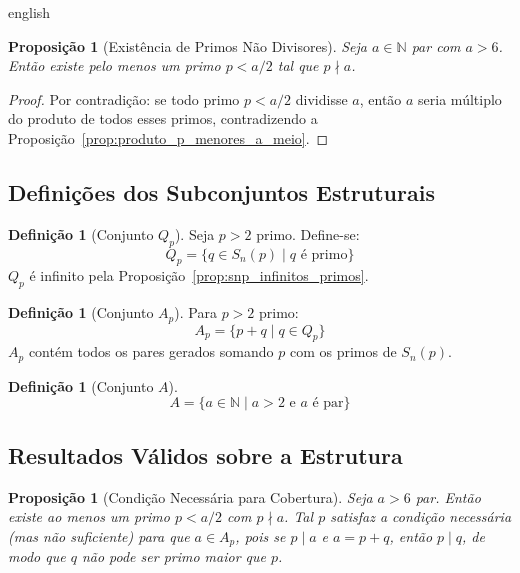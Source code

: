 \documentclass[a4paper,11pt]{article}
\newtheorem{proposition}[theorem]{Proposição}
\theoremstyle{definition}
\newtheorem{definition}[theorem]{Definição}
\theoremstyle{remark}
\begin{document}
\begin{otherlanguage*}{english}
		\begin{proposition}[Existência de Primos Não Divisores]%
			\label{prop:existencia_de_primos_nao_divisores}
			Seja $a \in \mathbb{N}$ par com $a > 6$. Então existe pelo menos um
			primo $p < a/2$ tal que $p \nmid a$.
		\end{proposition}
		
		\begin{proof}
			Por contradição: se todo primo $p < a/2$ dividisse $a$, então $a$ seria
			múltiplo do produto de todos esses primos, contradizendo a
			Proposição~\ref{prop:produto_p_menores_a_meio}.
		\end{proof}
		
		\subsection{Definições dos Subconjuntos Estruturais}
		
		\begin{definition}[Conjunto $Q_p$]
			Seja $p > 2$ primo. Define-se:
			\[
			Q_p = \{q \in S_n(p) \mid q \text{ é primo}\}
			\]
			$Q_p$ é infinito pela Proposição~\ref{prop:snp_infinitos_primos}.
		\end{definition}
		
		\begin{definition}[Conjunto $A_p$]\label{def:Ap}
			Para $p > 2$ primo:
			\[
			A_p = \{p + q \mid q \in Q_p\}
			\]
			$A_p$ contém todos os pares gerados somando $p$ com os primos de $S_n(p)$.
		\end{definition}
		
		\begin{definition}[Conjunto $A$]
			\[
			A = \{a \in \mathbb{N} \mid a > 2 \text{ e } a \text{ é par}\}
			\]
		\end{definition}
		
		\subsection{Resultados Válidos sobre a Estrutura}
		
		\begin{proposition}[Condição Necessária para Cobertura]%
			\label{prop:condicao_necessaria}
			Seja $a > 6$ par. Então existe ao menos um primo $p < a/2$ com $p \nmid a$.
			Tal $p$ satisfaz a \emph{condição necessária} (mas não suficiente) para que
			$a \in A_p$, pois se $p \mid a$ e $a = p + q$, então $p \mid q$, de modo que
			$q$ não pode ser primo maior que $p$.
		\end{proposition}
		

\end{otherlanguage*}
\end{document}
